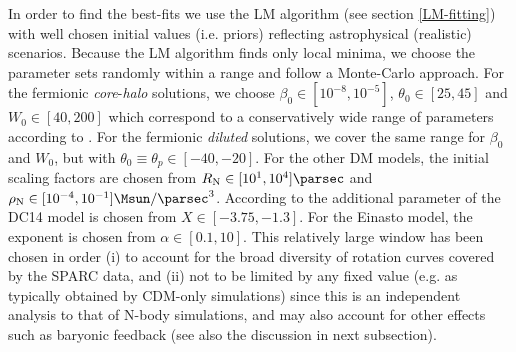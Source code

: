 In order to find the best-fits we use the LM algorithm (see section \ref{LM-fitting}) with well chosen initial values (i.e. priors) reflecting astrophysical (realistic) scenarios. Because the LM algorithm finds only local minima, we choose the parameter sets randomly within a range and follow a Monte-Carlo approach. For the fermionic \textit{core}-\textit{halo} solutions, we choose $\beta_0 \in [10^{-8},10^{-5}]$, $\theta_0\in [25,45]$ and $W_0\in[40,200]$ which correspond to a conservatively wide range of parameters according to \citet{2019PDU....24..278A}. For the fermionic \textit{diluted} solutions, we cover the same range for $\beta_0$ and $W_0$, but with $\theta_0\equiv\theta_p \in [-40,-20]$. For the other DM models, the initial scaling factors are chosen from $R_{\rm N}\in[10^{1}, 10^{4}]\si{\parsec}$ and $\rho_{\rm N} \in [10^{-4}, 10^{-1}]\si{\Msun\per\parsec^3}$. According to \citet{2017MNRAS.466.1648K} the additional parameter of the DC14 model is chosen from $X\in[-3.75,-1.3]$. For the Einasto model, the exponent is chosen from $\alpha\in[0.1, 10]$. This relatively large window has been chosen in order (i) to account for the broad diversity of rotation curves covered by the SPARC data, and (ii) not to be limited by any fixed value (e.g. as typically obtained by CDM-only simulations) since this is an independent analysis to that of N-body simulations, and may also account for other effects such as baryonic feedback (see also the discussion in next subsection).
